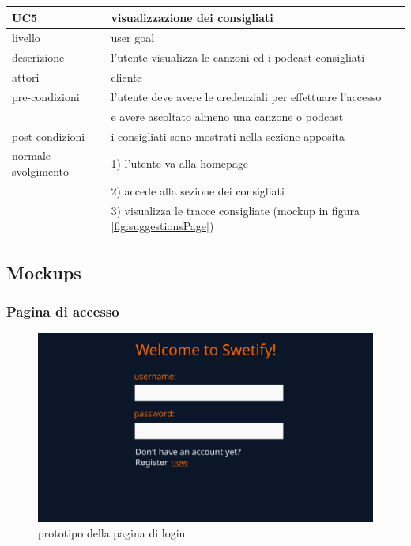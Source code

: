 \documentclass{article}
\begin{document}
  \vspace{40pt}

  \begin{table}[H]
    \centering
    \begin{tabular}{|l|l|}
      \hline
      \textbf{UC5} & \textbf{visualizzazione dei consigliati}\\
      \hline
      livello & user goal\\
      \hline
      descrizione & l'utente visualizza le canzoni ed i podcast consigliati\\
      \hline
      attori & cliente\\
      \hline
      pre-condizioni & l'utente deve avere le credenziali per effettuare l'accesso \\
      & e avere ascoltato almeno una canzone o podcast\\
      \hline
      post-condizioni & i consigliati sono mostrati nella sezione apposita\\
      \hline
      normale svolgimento \hspace{5pt} & 1) l'utente va alla homepage\\
      & 2) accede alla sezione dei consigliati\\
      & 3) visualizza le tracce consigliate (mockup in figura \ref{fig:suggestionsPage})\\
      \hline
    \end{tabular}
    \label{tab:uct5}
  \end{table}

  \pagebreak

  \subsection{Mockups}

  \subsubsection{Pagina di accesso}
  \begin{figure}[H]
    \centering
    \includegraphics[scale=0.25]{welcome}
    \caption{prototipo della pagina di login}
    \label{fig:loginPage}
  \end{figure}
\end{document}
